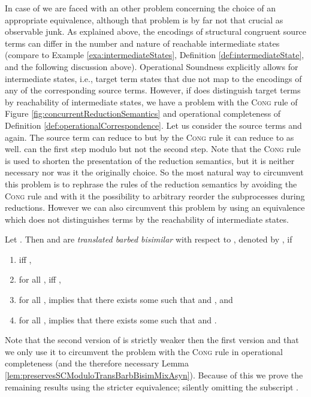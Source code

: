 \documentclass[]{llncs}
\begin{document}
In case of  we are faced with an other problem concerning the choice of an appropriate equivalence, although that problem is by far not that crucial as observable junk. As explained above, the encodings of structural congruent source terms can differ in the number and nature of reachable intermediate states (compare to Example \ref{exa:intermediateStates}, Definition \ref{def:intermediateState}, and the following discussion above). Operational Soundness explicitly allows for intermediate states, i.e., target term states that due not map to the encodings of any of the corresponding source terms. However, if  does distinguish target terms by reachability of intermediate states, we have a problem with the \textsc{Cong} rule of Figure \ref{fig:concurrentReductionSemantics} and operational completeness of Definition \ref{def:operationalCorrespondence}. Let us consider the source terms  and  again. The source term  can reduce to  but by the \textsc{Cong} rule it can reduce to  as well.  can \simulate the first step modulo  but not the second step. Note that the \textsc{Cong} rule is used to shorten the presentation of the reduction semantics, but it is neither necessary nor was it the originally choice. So the most natural way to circumvent this problem is to rephrase the rules of the reduction semantics by avoiding the \textsc{Cong} rule and with it the possibility to arbitrary reorder the subprocesses during reductions. However we can also circumvent this problem by using an equivalence which does not distinguishes terms by the reachability of intermediate states.

\begin{definition} \label{def:transBarbBisimB}
	Let . Then  and  are \emph{translated barbed bisimilar} with respect to , denoted by , if
	\begin{enumerate}
		\item  iff ,
		\item for all ,  iff ,
		\item for all ,  implies that there exists some  such that  and , and
		\item for all ,  implies that there exists some  such that  and .
	\end{enumerate}
\end{definition}

Note that the second version of  is strictly weaker then the first version and that we only use it to circumvent the problem with the \textsc{Cong} rule in operational completeness (and the therefore necessary Lemma \ref{lem:preservesSCModuloTransBarbBisimMixAsyn}). Because of this we prove the remaining results using the stricter equivalence; silently omitting the subscript .
\end{document}
